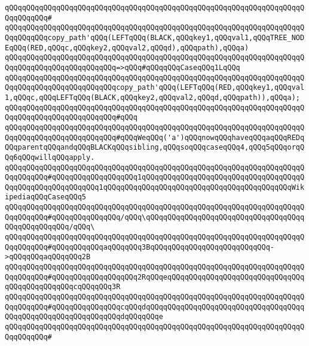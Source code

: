 \verb|qQQqqQQqqQQqqQQqqQQqqQQqqQQqqQQqqQQqqQQqqQQqqQQqqQQqqQQqqQQqqQQqqQQqqQQqqQQqqQQq#|\newline
\verb|qQQqqQQqqQQqqQQqqQQqqQQqqQQqqQQqqQQqqQQqqQQqqQQqqQQqqQQqqQQqqQQqqQQqqQQqqQQqqQQqcopy_path'qQQq(LEFTqQQq(BLACK,qQQqkey1,qQQqval1,qQQqTREE_NODEqQQq(RED,qQQqc,qQQqkey2,qQQqval2,qQQqd),qQQqpath),qQQqa)|\newline
\verb|qQQqqQQqqQQqqQQqqQQqqQQqqQQqqQQqqQQqqQQqqQQqqQQqqQQqqQQqqQQqqQQqqQQqqQQqqQQqqQQqqQQqqQQqqQQqqQQq=>qQQq#qQQqqQQqCaseqQQq1LqQQq|\newline
\verb|qQQqqQQqqQQqqQQqqQQqqQQqqQQqqQQqqQQqqQQqqQQqqQQqqQQqqQQqqQQqqQQqqQQqqQQqqQQqqQQqqQQqqQQqqQQqqQQqcopy_path'qQQq(LEFTqQQq(RED,qQQqkey1,qQQqval1,qQQqc,qQQqLEFTqQQq(BLACK,qQQqkey2,qQQqval2,qQQqd,qQQqpath)),qQQqa);|\newline
\verb|qQQqqQQqqQQqqQQqqQQqqQQqqQQqqQQqqQQqqQQqqQQqqQQqqQQqqQQqqQQqqQQqqQQqqQQqqQQqqQQqqQQqqQQqqQQqqQQq#qQQq|\newline
\verb|qQQqqQQqqQQqqQQqqQQqqQQqqQQqqQQqqQQqqQQqqQQqqQQqqQQqqQQqqQQqqQQqqQQqqQQqqQQqqQQqqQQqqQQqqQQqqQQq#qQQqWeqQQq('a')qQQqnowqQQqhaveqQQqaqQQqREDqQQqparentqQQqandqQQqBLACKqQQqsibling,qQQqsoqQQqcaseqQQq4,qQQq5qQQqorqQQq6qQQqwillqQQqapply.|\newline
\newline
\verb|qQQqqQQqqQQqqQQqqQQqqQQqqQQqqQQqqQQqqQQqqQQqqQQqqQQqqQQqqQQqqQQqqQQqqQQqqQQqqQQq#qQQqqQQqqQQqqQQqqQQq1qQQqqQQqqQQqqQQqqQQqqQQqqQQqqQQqqQQqqQQqqQQqqQQqqQQqqQQqqQQq1qQQqqQQqqQQqqQQqqQQqqQQqqQQqqQQqqQQqqQQqqQQqWikipediaqQQqCaseqQQq5|\newline
\verb|qQQqqQQqqQQqqQQqqQQqqQQqqQQqqQQqqQQqqQQqqQQqqQQqqQQqqQQqqQQqqQQqqQQqqQQqqQQqqQQq#qQQqqQQqqQQqqQQq/qQQq\qQQqqQQqqQQqqQQqqQQqqQQqqQQqqQQqqQQqqQQqqQQqqQQqqQQq/qQQq\|\newline
\verb|qQQqqQQqqQQqqQQqqQQqqQQqqQQqqQQqqQQqqQQqqQQqqQQqqQQqqQQqqQQqqQQqqQQqqQQqqQQqqQQq#qQQqqQQqqQQqaqQQqqQQq3BqQQqqQQqqQQqqQQqqQQqqQQqqQQq->qQQqqQQqaqQQqqQQq2B|\newline
\verb|qQQqqQQqqQQqqQQqqQQqqQQqqQQqqQQqqQQqqQQqqQQqqQQqqQQqqQQqqQQqqQQqqQQqqQQqqQQqqQQq#qQQqqQQqqQQqqQQqqQQq2RqQQqeqQQqqQQqqQQqqQQqqQQqqQQqqQQqqQQqqQQqqQQqqQQqqQQqcqQQqqQQq3R|\newline
\verb|qQQqqQQqqQQqqQQqqQQqqQQqqQQqqQQqqQQqqQQqqQQqqQQqqQQqqQQqqQQqqQQqqQQqqQQqqQQqqQQq#qQQqqQQqqQQqqQQqcqQQqdqQQqqQQqqQQqqQQqqQQqqQQqqQQqqQQqqQQqqQQqqQQqqQQqqQQqqQQqqQQqqQQqdqQQqqQQqe|\newline
\verb|qQQqqQQqqQQqqQQqqQQqqQQqqQQqqQQqqQQqqQQqqQQqqQQqqQQqqQQqqQQqqQQqqQQqqQQqqQQqqQQq#|\newline
